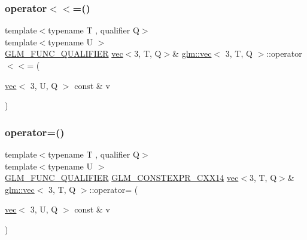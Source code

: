 \mbox{\label{structglm_1_1vec_3_013_00_01_t_00_01_q_01_4_a0e01e643e55134493df457aa0b17308e}} 
\subsubsection{\texorpdfstring{operator$<$$<$=()}{operator<<=()}\hspace{0.1cm}{\footnotesize\ttfamily [6/6]}}
{\footnotesize\ttfamily template$<$typename T , qualifier Q$>$ \\
template$<$typename U $>$ \\
\hyperlink{setup_8hpp_a33fdea6f91c5f834105f7415e2a64407}{G\+L\+M\+\_\+\+F\+U\+N\+C\+\_\+\+Q\+U\+A\+L\+I\+F\+I\+ER} \hyperlink{structglm_1_1vec}{vec}$<$3, T, Q$>$\& \hyperlink{structglm_1_1vec}{glm\+::vec}$<$ 3, T, Q $>$\+::operator$<$$<$= (\begin{DoxyParamCaption}\item[{\hyperlink{structglm_1_1vec}{vec}$<$ 3, U, Q $>$ const \&}]{v }\end{DoxyParamCaption})}

\mbox{\label{structglm_1_1vec_3_013_00_01_t_00_01_q_01_4_a8d40afef0f44dc9e5c765029f6af40df}} 
\subsubsection{\texorpdfstring{operator=()}{operator=()}\hspace{0.1cm}{\footnotesize\ttfamily [1/3]}}
{\footnotesize\ttfamily template$<$typename T , qualifier Q$>$ \\
template$<$typename U $>$ \\
\hyperlink{setup_8hpp_a33fdea6f91c5f834105f7415e2a64407}{G\+L\+M\+\_\+\+F\+U\+N\+C\+\_\+\+Q\+U\+A\+L\+I\+F\+I\+ER} \hyperlink{setup_8hpp_a4dd12abf5e1164bc57f3a34671d03844}{G\+L\+M\+\_\+\+C\+O\+N\+S\+T\+E\+X\+P\+R\+\_\+\+C\+X\+X14} \hyperlink{structglm_1_1vec}{vec}$<$3, T, Q$>$\& \hyperlink{structglm_1_1vec}{glm\+::vec}$<$ 3, T, Q $>$\+::operator= (\begin{DoxyParamCaption}\item[{\hyperlink{structglm_1_1vec}{vec}$<$ 3, U, Q $>$ const \&}]{v }\end{DoxyParamCaption})}



